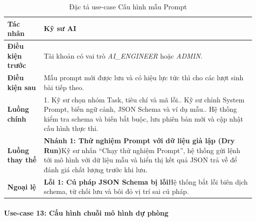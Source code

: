 \begingroup
\small
\begin{longtable}{|p{3.2cm}|p{\dimexpr\linewidth-3.2cm-4\tabcolsep-3\arrayrulewidth\relax}|}
\caption{Đặc tả use-case Cấu hình mẫu Prompt}
\label{aihub:tab:uc_config_prompt}\\
\hline
\textbf{Tác nhân} & Kỹ sư AI \\ \hline
\textbf{Điều kiện trước} & Tài khoản có vai trò \textit{AI\_ENGINEER} hoặc \textit{ADMIN}. \\ \hline
\textbf{Điều kiện sau} & Mẫu prompt mới được lưu và có hiệu lực tức thì cho các lượt sinh bài tiếp theo. \\ \hline
\textbf{Luồng chính} & 1. Kỹ sư chọn nhóm Task, tiêu chí và mã lỗi.\newline 2. Kỹ sư chỉnh System Prompt, biến ngữ cảnh, JSON Schema và ví dụ mẫu.\newline 3. Hệ thống kiểm tra schema và biến bắt buộc, lưu phiên bản mới và cập nhật cấu hình thực thi. \\ \hline
\textbf{Luồng thay thế} &
\textbf{Nhánh 1: Thử nghiệm Prompt với dữ liệu giả lập (Dry Run)}\newline Kỹ sư nhấn ``Chạy thử nghiệm Prompt'', hệ thống gửi lệnh tới mô hình với dữ liệu mẫu và hiển thị kết quả JSON trả về để đánh giá chất lượng trước khi lưu. \\ \hline
\textbf{Ngoại lệ} &
\textbf{Lỗi 1: Cú pháp JSON Schema bị lỗi}\newline Hệ thống bắt lỗi biên dịch schema, từ chối lưu và bôi đỏ vị trí sai cú pháp. \\ \hline
\end{longtable}
\endgroup

\paragraph{Use-case 13: Cấu hình chuỗi mô hình dự phòng}

